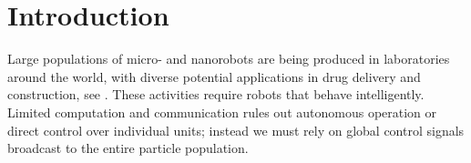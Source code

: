 \section{Introduction}\label{sec:Intro}


Large populations of micro- and nanorobots are being produced in laboratories around the world, with diverse potential applications in drug delivery and construction, see \cite{Peyer2013,Shirai2005,Chiang2011}. These activities require robots that behave intelligently.
Limited computation and communication rules out autonomous operation or direct control over individual units; instead we must rely on global control signals broadcast to the entire particle population.    
